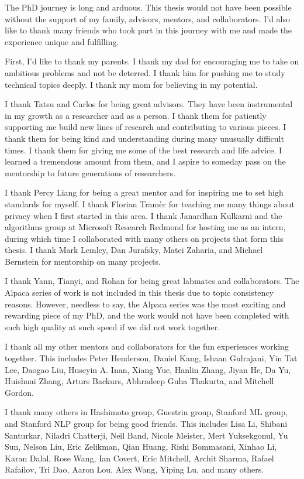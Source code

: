 
The PhD journey is long and arduous. 
This thesis would not have been possible without the support of my family, advisors, mentors, and collaborators.
I'd also like to thank many friends who took part in this journey with me and made the experience unique and fulfilling.

First, I'd like to thank my parents.
I thank my dad for encouraging me to take on ambitious problems and not be deterred.
I thank him for pushing me to study technical topics deeply.
I thank my mom for believing in my potential.

I thank Tatsu and Carlos for being great advisors.
They have been instrumental in my growth as a researcher and as a person.
I thank them for patiently supporting me build new lines of research and contributing to various pieces.
I thank them for being kind and understanding during many unusually difficult times.
I thank them for giving me some of the best research and life advice.
I learned a tremendous amount from them, and I aspire to someday pass on the mentorship to future generations of researchers.

I thank Percy Liang for being a great mentor and for inspiring me to set high standards for myself.
I thank Florian Tramèr for teaching me many things about privacy when I first started in this area.
I thank Janardhan Kulkarni and the algorithms group at Microsoft Research Redmond for hosting me as an intern, during which time I collaborated with many others on projects that form this thesis.
I thank Mark Lemley, Dan Jurafsky, Matei Zaharia, and Michael Bernstein for mentorship on many projects.

I thank Yann, Tianyi, and Rohan for being great labmates and collaborators.
The Alpaca series of work is not included in this thesis due to topic consistency reasons. 
However, needless to say, the Alpaca series was the most exciting and rewarding piece of my PhD, and the work would not have been completed with such high quality at such speed if we did not work together.

I thank all my other mentors and collaborators for the fun experiences working together. 
This includes Peter Henderson, Daniel Kang, Ishaan Gulrajani, Yin Tat Lee, Daogao Liu, Huseyin A. Inan, Xiang Yue, Hanlin Zhang, Jiyan He, Da Yu, Huishuai Zhang, Arturs Backurs, Abhradeep Guha Thakurta, and Mitchell Gordon.

I thank many others in Hashimoto group, Guestrin group, Stanford ML group, and Stanford NLP group for being good friends. 
This includes Lisa Li, Shibani Santurkar, Niladri Chatterji, Neil Band, Nicole Meister, Mert Yuksekgonul, Yu Sun, Nelson Liu, Eric Zelikman, Qian Huang, Rishi Bommasani, Xinhao Li, Karan Dalal, Rose Wang, Ian Covert, Eric Mitchell, Archit Sharma, Rafael Rafailov, Tri Dao, Aaron Lou, Alex Wang, Yiping Lu, and many others.

